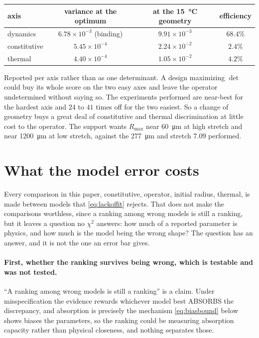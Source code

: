 \documentclass[10pt]{article}
\begin{document}
\begin{center}
\begin{tabular}{lccc}
\toprule
axis & variance at the optimum & at the \SI{15}{\celsius} geometry & efficiency \\
\midrule
dynamics & $6.78\times10^{-3}$ (binding) & $9.91\times10^{-3}$ & $68.4\%$ \\
constitutive & $5.45\times10^{-4}$ & $2.24\times10^{-2}$ & $2.4\%$ \\
thermal & $4.40\times10^{-4}$ & $1.05\times10^{-2}$ & $4.2\%$ \\
\bottomrule
\end{tabular}
\end{center}

\noindent Reported per axis rather than as one determinant. A design maximizing $\det$ could
buy its whole score on the two easy axes and leave the operator undetermined without saying
so. The experiments performed are near-best for the hardest axis and $24$ to $41$ times off for
the two easiest. So a change of geometry buys a great deal of constitutive and thermal
discrimination at little cost to the operator. The support wants $R_{\max}$ near
\SI{60}{\micro\metre} at high stretch and near \SI{1200}{\micro\metre} at low stretch, against
the \SI{277}{\micro\metre} and stretch $7.09$ performed.

\section{What the model error costs}
\label{sec:discrepancy}

Every comparison in this paper, constitutive, operator, initial radius, thermal, is made
between models that \cref{eq:lackoffit} rejects. That does not make the comparisons
worthless, since a ranking among wrong models is still a ranking, but it leaves a question no
$\chi^2$ answers: how much of a reported parameter is physics, and how much is the model being
the wrong shape? The question has an answer, and it is not the one an error bar gives.

\paragraph{First, whether the ranking survives being wrong, which is testable and was not tested.}
``A ranking among wrong models is still a ranking'' is a claim. Under misspecification the
evidence rewards whichever model best ABSORBS the discrepancy, and absorption is precisely the
mechanism \eqref{eq:biasbound} below shows biases the parameters, so the ranking could be
measuring absorption capacity rather than physical closeness, and nothing separates those.
\end{document}
